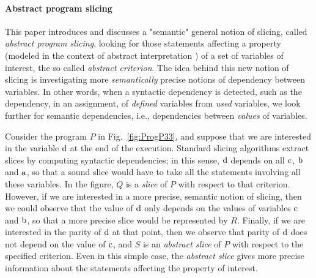 \documentclass[prodmode,acmtocl]{acmsmall}
\def\prog{\ensuremath{P}\xspace}
\def\progq{\ensuremath{Q}\xspace}
\def\progr{\ensuremath{R}\xspace}
\def\progss{\ensuremath{S}\xspace}
\newcommand{\0}{\mbox{\bf 0}}
\newcommand{\CODE}[1]{\ensuremath{\mbox{\lstinline!#1!}\xspace}\xspace}
\begin{document}
\paragraph{Abstract program slicing}

This paper introduces and discusses a "semantic" general notion of
slicing, called \emph{abstract program slicing}, looking for those
statements affecting a property (modeled in the context of abstract
interpretation \cite{CC77}) of a set of variables of interest, the so
called \emph{abstract criterion}.  The idea behind this new notion of
slicing is investigating more \emph{semantically} precise notions of
dependency between variables.  In other words, when a syntactic
dependency is detected, such as the dependency, in an assignment, of
\emph{defined} variables from \emph{used} variables, we look further
for semantic dependencies, i.e., dependencies between \emph{values} of
variables.

Consider the program $\prog$ in Fig.~\ref{fig:ProgP33}, and suppose
that we are interested in the variable \CODE{d} at the end of the
execution.  Standard slicing algorithms extract slices by computing
syntactic dependencies; in this sense, \CODE{d} depends on all
\CODE{c}, \CODE{b} and \CODE{a}, so that a sound slice would have to
take all the statements involving all these variables.  In the figure,
$\progq$ is a \emph{slice} of $\prog$ with respect to that criterion.
However, if we are interested in a more precise, semantic notion of
slicing, then we could observe that the value of \CODE{d} only depends
on the values of variables \CODE{c} and \CODE{b}, so that a more
precise slice would be represented by $\progr$.  Finally, if we are
interested in the parity of \CODE{d} at that point, then we observe
that parity of \CODE{d} does not depend on the value of \CODE{c}, and
$\progss$ is an \emph{abstract slice} of $\prog$ with respect to the
specified criterion.  Even in this simple case, the \emph{abstract
  slice} gives more precise information about the statements affecting
the property of interest.
\end{document}
